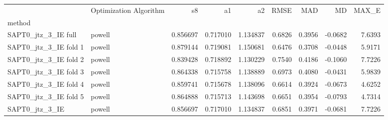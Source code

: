 \begin{tabular}{llrrrrrrr}
 & Optimization Algorithm & s8 & a1 & a2 & RMSE & MAD & MD & MAX_E \\
method &  &  &  &  &  &  &  &  \\
SAPT0_jtz_3_IE full & powell & 0.856697 & 0.717010 & 1.134837 & 0.6826 & 0.3956 & -0.0682 & 7.6393 \\
SAPT0_jtz_3_IE fold 1 & powell & 0.879144 & 0.719081 & 1.150681 & 0.6476 & 0.3708 & -0.0448 & 5.9171 \\
SAPT0_jtz_3_IE fold 2 & powell & 0.839428 & 0.718892 & 1.130229 & 0.7540 & 0.4186 & -0.1060 & 7.7226 \\
SAPT0_jtz_3_IE fold 3 & powell & 0.864338 & 0.715758 & 1.138889 & 0.6973 & 0.4080 & -0.0431 & 5.9839 \\
SAPT0_jtz_3_IE fold 4 & powell & 0.859741 & 0.715678 & 1.138096 & 0.6614 & 0.3924 & -0.0673 & 4.6252 \\
SAPT0_jtz_3_IE fold 5 & powell & 0.864888 & 0.715713 & 1.143698 & 0.6651 & 0.3954 & -0.0793 & 4.7314 \\
SAPT0_jtz_3_IE & powell & 0.856697 & 0.717010 & 1.134837 & 0.6851 & 0.3971 & -0.0681 & 7.7226 \\
\end{tabular}
